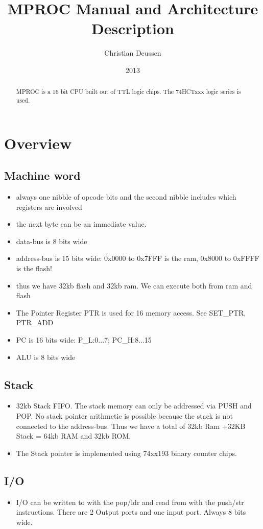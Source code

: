 \documentclass[a4paper, 12pt]{article}
\title{MPROC Manual and Architecture Description}
\author{Christian Deussen}
\date{2013}
\begin{document}
	\maketitle
	\begin{abstract}
		MPROC is a 16 bit CPU built out of TTL logic chips. The 74HCTxxx logic series is used.
	\end{abstract}
	\tableofcontents
	\newpage
	\section{Overview}
	\subsection {Machine word}
	\begin{itemize}
		\item always one nibble of opcode bits and the second nibble includes which registers are involved
		\item the next byte can be an immediate value.
		\item data-bus is 8 bits wide
		\item address-bus is 15 bits wide: 0x0000 to 0x7FFF is the ram, 0x8000 to 0xFFFF is the flash! 
		\item thus we have 32kb flash and 32kb ram. We can execute both from ram and flash
		\item The Pointer Register PTR is used for 16 memory access. See SET\_PTR, PTR\_ADD
		\item PC is 16 bits wide: P\_L:0...7; PC\_H:8...15
		\item ALU is 8 bits wide
	\end{itemize}

	\subsection {Stack}
	\begin{itemize}
		\item 32kb Stack FIFO. The stack memory can only be addressed via PUSH and POP. No stack pointer arithmetic is possible because the stack is not connected to the address-bus. Thus we have a total of 32kb Ram +32KB Stack = 64kb RAM and 32kb ROM.
		\item The Stack pointer is implemented using 74xx193 binary counter chips. 
	\end{itemize}

	\subsection{I/O}
	\begin{itemize}
		\item I/O can be written to with the pop/ldr and read from with the push/str instructions. There are 2 Output ports and one input port. Always 8 bits wide.
	\end{itemize}
\end{document}
